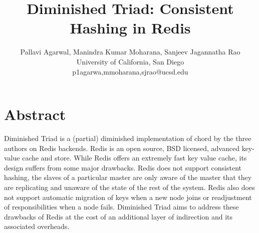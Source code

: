 \documentclass[10pt,twocolumn,letterpaper]{article}
\begin{document}
\title{Diminished Triad: Consistent Hashing in Redis}

\author{Pallavi Agarwal, Manindra Kumar Moharana, Sanjeev Jagannatha Rao\\
University of California, San Diego\\
\small p1agarwa,mmoharana,sjrao@ucsd.edu}



\maketitle


\section{Abstract}
Diminished Triad is a (partial) diminished implementation of chord by the three authors on Redis backends. Redis is an open source, BSD licensed, advanced key-value cache and store.
While Redis offers an extremely fast key value cache, its design suffers from some major drawbacks. Redis does not support consistent hashing, the slaves of a particular master are only aware of the master that they are replicating and unaware of the state of the rest of the system. Redis also does not support automatic migration of keys when a new node joins or readjustment of responsibilities when a node fails. Diminished Triad aims to address these drawbacks of Redis at the cost of an additional layer of indirection and its associated overheads.
\end{document}
